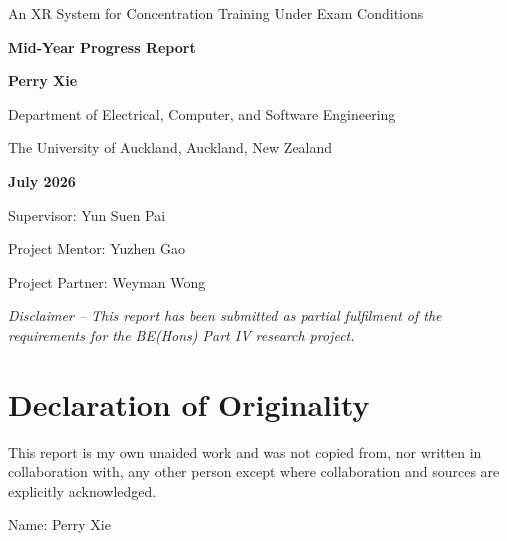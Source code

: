 \documentclass[11pt,a4paper]{article}
\begin{document}
\begin{titlepage}
    \centering
    \vspace*{1.2cm}

    {\fontsize{28}{34}\selectfont An XR System for Concentration Training Under Exam Conditions\par}
    \vspace{0.8cm}
    {\fontsize{16}{20}\selectfont\bfseries Mid-Year Progress Report\par}

    \vspace{1.8cm}
    {\fontsize{16}{20}\selectfont\bfseries Perry Xie\par}

    \vspace{1.4cm}
    {\fontsize{14}{18}\selectfont
    Department of Electrical, Computer, and Software Engineering\par
    The University of Auckland, Auckland, New Zealand\par}

    \vfill
    {\fontsize{16}{20}\selectfont\bfseries July 2026\par}

    \vspace{1.4cm}
    {\fontsize{16}{20}\selectfont
    Supervisor: Yun Suen Pai\par
    Project Mentor: Yuzhen Gao\par
    Project Partner: Weyman Wong\par}

    \vfill
    \begin{minipage}{0.9\textwidth}
        \centering\fontsize{10}{13}\selectfont\itshape\sffamily
        Disclaimer -- This report has been submitted as partial fulfilment of the
        requirements for the BE(Hons) Part IV research project.
    \end{minipage}
\end{titlepage}

\clearpage
\section*{Declaration of Originality}
This report is my own unaided work and was not copied from, nor written in
collaboration with, any other person except where collaboration and sources are
explicitly acknowledged.

\vspace{2em}
Name: Perry Xie

\clearpage
\tableofcontents
\end{document}
